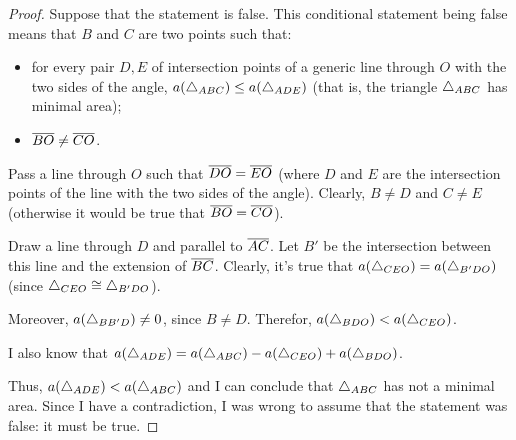 \begin{proof}
    Suppose that the statement is false. This conditional statement being false means that \(B\) and \(C\) are two points such that:
    \begin{itemize}
        \item for every pair \(D,E\) of intersection points of a generic line through \(O\) with the two sides of the angle, \(a(\triangle_{ABC}) \leq a(\triangle_{ADE})\) (that is, the triangle \(\triangle_{ABC}\) has minimal area);
        \item \(\overline{BO} \ne \overline{CO}\).
    \end{itemize}
    Pass a line through \(O\) such that \(\overline{DO} = \overline{EO}\) (where \(D\) and \(E\) are the intersection points of the line with the two sides of the angle). Clearly, \(B \neq D\) and \(C \neq E\) (otherwise it would be true that \(\overline{BO} = \overline{CO}\)).
    \begin{figure}[H]
        \centering
        
    \end{figure}
    Draw a line through \(D\) and parallel to \(\overline{AC}\). Let \(B'\) be the intersection between this line and the extension of \(\overline{BC}\). Clearly, it's true that \(a(\triangle_{CEO}) = a(\triangle_{B'DO})\) (since \(\triangle_{CEO} \cong \triangle_{B'DO}\)).
    \begin{figure}[H]
        \centering
        
    \end{figure}
    Moreover, \(a(\triangle_{BB'D}) \neq 0\), since \(B \neq D\). Therefor, \(a(\triangle_{BDO}) < a(\triangle_{CEO})\).\par
    I also know that \(a(\triangle_{ADE}) = a(\triangle_{ABC}) - a(\triangle_{CEO}) + a(\triangle_{BDO})\).
    \begin{figure}[H]
        \centering
        
    \end{figure}
    Thus, \(a(\triangle_{ADE}) < a(\triangle_{ABC})\) and I can conclude that \(\triangle_{ABC}\) has not a minimal area. Since I have a contradiction, I was wrong to assume that the statement was false: it must be true.
\end{proof}